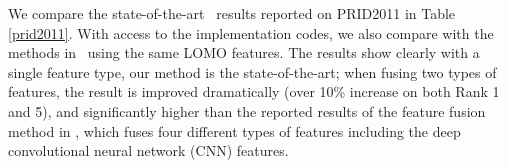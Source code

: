 \documentclass[10pt,twocolumn,letterpaper]{article}
\begin{document}
 \quad  We compare the state-of-the-art~\cite{hirzer2012relaxed, paisitkriangkrailearning} results reported on PRID2011 in Table \ref{prid2011}. With access to the implementation codes, we also compare with the methods in~\cite{liao2015person, xiong2014person, lisanti2014matching} using the same LOMO features. The results show clearly with a single feature type, our method is the state-of-the-art; when fusing two types of features, the result is improved dramatically (over 10\% increase on both Rank 1 and 5), and significantly higher than the reported results of the feature fusion method in \cite{paisitkriangkrailearning}, which fuses four different types of features including the deep convolutional neural network (CNN) features.

	\begin{table}[H]
		\centering
		\caption{Fully supervised results on PRID2011}
		\label{prid2011}
	\end{table}
\end{document}

